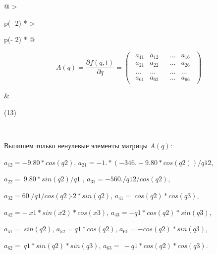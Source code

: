 \begin{longtable}{@{}
  >{\raggedright\arraybackslash}p{(\columnwidth - 2\tabcolsep) * }
  >{\raggedright\arraybackslash}p{(\columnwidth - 2\tabcolsep) * }@{}}
\begin{minipage}[b]{\linewidth}\raggedright
\[A(q) = \frac{\partial f(q,t)}{\partial q} = \begin{pmatrix}
\begin{matrix}
a_{11} & a_{12} \\
a_{21} & a_{22}
\end{matrix} & \begin{matrix}
\ldots & a_{16} \\
\ldots & a_{26}
\end{matrix} \\
\begin{matrix}
\ldots & \ldots \\
a_{61} & a_{62}
\end{matrix} & \begin{matrix}
\ldots & \ldots \\
\ldots & a_{66}
\end{matrix}
\end{pmatrix}\]
\end{minipage} & \begin{minipage}[b]{\linewidth}\raggedright
(13)
\end{minipage} \\

\end{longtable}


Выпишем только ненулевые элементы матрицы \(A(q)\):

\(a_{12} = - 9.80*cos(q2)\),
\(a_{21} = - 1.*( - 346. - 9.80*cos(q2))/q1\hat{}2\),

\(a_{22} = \ 9.80*sin(q2)/q1\) , \(a_{31} = - 560./q1\hat{}2/cos(q2)\),

\(a_{32} = 60./q1/cos(q2)\hat{}2*sin(q2)\),
\(a_{41} = \ cos(q2)*cos(q3)\),

\(a_{42} = - \ x1*sin(x2)*cos(x3)\), \(a_{43} = - q1*cos(q2)*sin(q3)\),

\(a_{51} = \ sin(q2)\), \(a_{52} = q1*cos(q2)\),
\(a_{61} = - cos(q2)*sin(q3)\),

\(a_{62} = \ q1*sin(q2)*sin(q3)\), \(a_{63} = \  - q1*cos(q2)*cos(q3)\).

